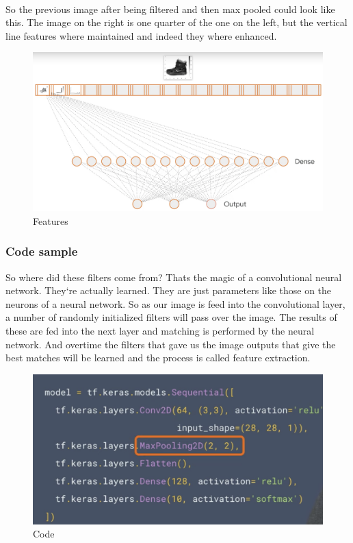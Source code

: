\documentclass{article}
\begin{document}
    \paragraph{}
    So the previous image after being filtered and then max pooled could look like this. The image on the right is one quarter of the one on the left, but the vertical line features where maintained and indeed they where enhanced.

    \vspace{10mm}
    \begin{figure}[h!]
      \begin{center}
        \includegraphics[width=0.7\linewidth]{img/features.png}
        \caption{Features}
        \label{fig:snn}
      \end{center}
    \end{figure}
    \subsubsection{Code sample}
    So where did these filters come from? Thats the magic of a convolutional neural network. They`re actually learned. They are just parameters like those on the neurons of a neural network. So as our image is feed into the convolutional layer, a number of randomly initialized filters will pass over the image. The results of these are fed into the next layer and matching is performed by the neural network. And overtime the filters that gave us the image outputs that give the best matches will be learned and the process is called feature extraction. 
    \vspace{10mm}
    \begin{figure}[h!]
      \includegraphics[width=0.4\linewidth]{img/code.png}
      \caption{Code}
      \label{fig:snn}
    \end{figure}
\end{document}
